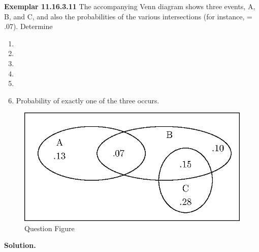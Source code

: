 \documentclass[journal,12pt,twocolumn]{IEEEtran}
\begin{document}
\bigskip
\renewcommand{\thefigure}{\theenumi}
\renewcommand{\thetable}{\theenumi}
\textbf{Exemplar 11.16.3.11}
The accompanying Venn diagram shows three events, A, B, and C, and also the probabilities of the various intersections (for instance,  = .07). Determine
\begin{enumerate}[label=(\alph*)]
\item 
{}
\item 
{}
\item 
{}
\item 
{}
\item 
{}
\item 
Probability of exactly one
of the three occurs.
\end{enumerate}
\begin{enumerate}
\begin{figure}[h!]
\includegraphics{figs/new-figure0}
\caption{Question Figure}
\label{fig}
\end{figure}
\end{enumerate}
\textbf{Solution.}
\end{document}
